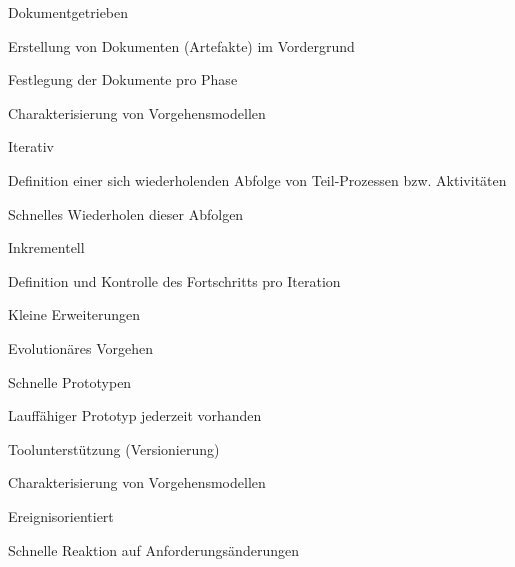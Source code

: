 \documentclass[a4paper]{article}
\begin{document}
\begin{multicols}{3}
\begin{itemize*}
\begin{itemize*}
\begin{itemize*}
                  \end{itemize*}
            \item Dokumentgetrieben
                  \begin{itemize*}
                    \item Erstellung von Dokumenten (Artefakte) im Vordergrund
                    \item Festlegung der Dokumente pro Phase
                  \end{itemize*}
          \end{itemize*}
    \item Charakterisierung von Vorgehensmodellen
          \begin{itemize*}
            \item Iterativ
                  \begin{itemize*}
                    \item Definition einer sich wiederholenden Abfolge von Teil-Prozessen bzw. Aktivitäten
                    \item Schnelles Wiederholen dieser Abfolgen
                  \end{itemize*}
            \item Inkrementell
                  \begin{itemize*}
                    \item Definition und Kontrolle des Fortschritts pro Iteration
                    \item Kleine Erweiterungen
                  \end{itemize*}
            \item Evolutionäres Vorgehen
                  \begin{itemize*}
                    \item Schnelle Prototypen
                    \item Lauffähiger Prototyp jederzeit vorhanden
                    \item Toolunterstützung (Versionierung)
                  \end{itemize*}
          \end{itemize*}
    \item Charakterisierung von Vorgehensmodellen
          \begin{itemize*}
            \item Ereignisorientiert
                  \begin{itemize*}
                    \item Schnelle Reaktion auf Anforderungsänderungen

\end{itemize*}
\end{itemize*}
\end{itemize*}
\end{multicols}
\end{document}

